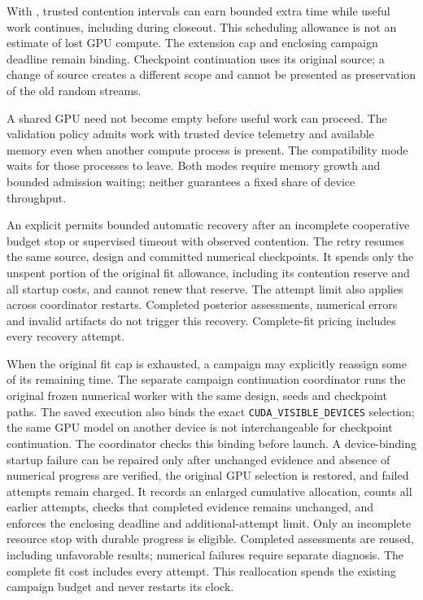With , trusted contention intervals
can earn bounded extra time while useful work continues, including during
closeout. This scheduling allowance is not an estimate of lost GPU compute.
The extension cap and enclosing campaign deadline remain binding. Checkpoint
continuation uses its original source; a change of source creates a different
scope and cannot be presented as preservation of the old random streams.

A shared GPU need not become empty before useful work can proceed. The
validation policy  admits work with trusted
device telemetry and available memory even when another compute process is
present. The compatibility mode  waits for
those processes to leave. Both modes require memory growth and bounded
admission waiting; neither guarantees a fixed share of device throughput.

An explicit  permits bounded automatic recovery
after an incomplete cooperative budget stop or supervised timeout with observed
contention. The retry resumes the same source, design and committed numerical
checkpoints. It spends only the unspent portion of the original fit allowance,
including its contention reserve and all startup costs, and cannot renew that
reserve. The attempt limit also applies across coordinator restarts. Completed
posterior assessments, numerical errors and invalid artifacts do not trigger
this recovery. Complete-fit pricing includes every recovery attempt.

When the original fit cap is exhausted, a campaign may explicitly reassign
some of its remaining time. The separate campaign continuation coordinator
runs the original frozen numerical worker with the same design, seeds and
checkpoint paths. The saved execution also binds the exact
\texttt{CUDA\_VISIBLE\_DEVICES} selection; the same GPU model on another device
is not interchangeable for checkpoint continuation. The coordinator checks
this binding before launch. A device-binding startup failure can be repaired
only after unchanged evidence and absence of numerical progress are verified,
the original GPU selection is restored, and failed attempts remain charged.
It records an enlarged cumulative allocation, counts all
earlier attempts, checks that completed evidence remains unchanged, and enforces
the enclosing deadline and additional-attempt limit. Only an incomplete resource
stop with durable progress is eligible. Completed assessments are reused,
including unfavorable results; numerical failures require separate diagnosis.
The complete fit cost includes every attempt. This reallocation spends the
existing campaign budget and never restarts its clock.

